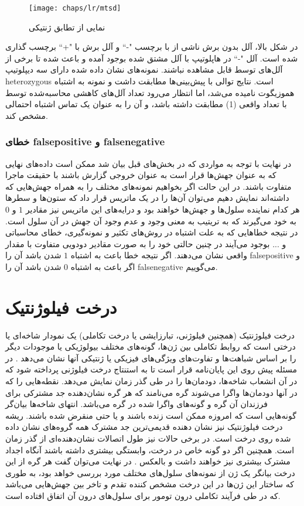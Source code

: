 \begin{figure}[!ht]
	\centerline{\texttt{[image: chaps/lr/mtsd]}}
	\caption{نمایی از تطابق ژنتیکی}
	\label{fig:ch_lr:mtsd}
\end{figure}

در شکل بالا، آلل  بدون برش ناشی از  با برچسب "-`` و آلل برش با "+`` برچسب گذاری شده است. آلل "-`` در هاپلوتیپ با آلل  مشتق شده بوجود آمده و باعث شده تا برخی از آلل‌های  توسط  قابل مشاهده نباشند. نمونه‌های نشان داده شده دارای سه دیپلوتیپ \gls{heterozygous} است. نتایج توالی با پیش‌بینی‌ها مطابقت داشت و نمونه  به اشتباه هموزیگوت نامیده می‌شد، اما انتظار می‌رود تعداد آلل‌های کاهشی محاسبه‌شده توسط  با تعداد واقعی (1) مطابقت داشته باشد، و آن را به عنوان یک تماس اشتباه احتمالی مشخص کند.

\subsubsection{خطای \gls{falsepositive} و \gls{falsenegative}}
در نهایت با توجه به مواردی که در بخش‌های قبل بیان شد ممکن است داده‌های نهایی که به عنوان جهش‌ها قرار است به عنوان خروجی گزارش باشند با حقیقت ماجرا متفاوت باشند. در این حالت اگر بخواهیم نمونه‌های مختلف را به همراه جهش‌هایی که داشته‌اند نمایش دهیم می‌توان آن‌ها را در یک ماتریس قرار داد که ستون‌ها و سطرها هر کدام نماینده سلول‌ها و جهش‌ها خواهند بود و درایه‌های این ماتریس نیز مقادیر $1$ و $0$ به خود می‌گیرند که به تریتیب به معنی وجود و عدم وجود آن جهش در آن سلول است. در نتیجه خطاهایی که به علت اشتباه در روش‌های تکثیر و نمونه‌گیری، خطای محاسباتی و ... بوجود می‌آیند در چنین حالتی خود را به صورت مقادیر دودویی متفاوت با مقدار واقعی نشان می‌دهند. اگر نتیجه خطا باعث به اشتباه $1$ شدن باشد آن را \gls{falsepositive} و اگر باعث به اشتباه $0$ شدن باشد آن را \gls{falsenegative} می‌گوییم.

\section{درخت فیلوژنتیک}
درخت فیلوژنتیک (همچنین فیلوژنی، تبارزایشی یا درخت تکاملی) یک نمودار شاخه‌ای یا درختی است که روابط تکاملی بین ژن‌ها، گونه‌های مختلف بیولوژیکی یا موجودات دیگر را بر اساس شباهت‌ها و تفاوت‌های ویژگی‌های فیزیکی یا ژنتیکی آنها نشان می‌دهد \cite{davis2016computing}. در مسئله پیش روی این پایان‌نامه قرار است تا به استنتاج درخت فیلوژنی پرداخته شود که در آن انشعاب شاخه‌ها، دودمان‌ها را در طی گذر زمان نمایش می‌دهد. نقطه‌هایی را که در آنها دودمان‌ها واگرا می‌شوند گره می‌نامند که هر گره نشان‌دهنده جد مشترکی برای فرزندان آن گره و گونه‌های واگرا شده در گره می‌باشد. انتهای شاخه‌ها بیان‌گر گونه‌هایی است که امروزه ممکن است زنده باشند و یا حتی منقرض شده باشند. ریشه درخت فیلوژنتیک نیز نشان دهنده قدیمی‌ترین جد مشترک همه گروه‌های نشان داده شده روی درخت است. در برخی حالات نیز طول اتصالات نشان‌دهنده‌ای از گذر زمان است. همچنین اگر دو گونه خاص در درخت، وابستگی بیشتری داشته باشند آنگاه اجداد مشترک بیشتری نیز خواهند داشت و بالعکس \cite{gori2016clustering}. در نهایت می‌توان گفت هر گره از این درخت بیانگر یک ژن از نمونه‌های سلول‌های مختلف مورد بررسی خواهد بود، به طوری که ساختار این ژن‌ها در این درخت مشخص کننده تقدم و تاخر بین جهش‌هایی می‌باشد که در طی فرآیند تکاملی درون تومور برای سلول‌های درون آن اتفاق افتاده است.

